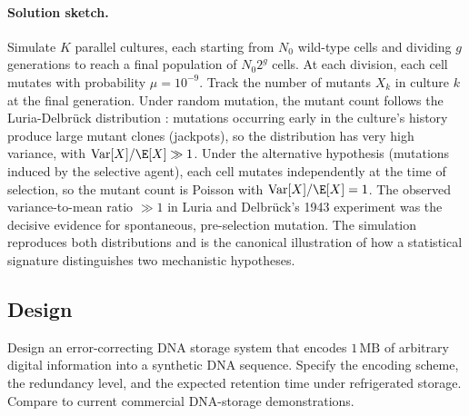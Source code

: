 \paragraph{Solution sketch.} Simulate $K$ parallel cultures, each
starting from $N_0$ wild-type cells and dividing $g$ generations to
reach a final population of $N_0 2^g$ cells. At each division, each
cell mutates with probability $\mu = 10^{-9}$. Track the number of
mutants $X_k$ in culture $k$ at the final generation. Under random
mutation, the mutant count follows the Luria-Delbr\"uck distribution
\cite{paper:v6c03-luria-delbruck-1943}: mutations occurring early in
the culture's history produce large mutant clones (jackpots), so
the distribution has very high variance, with $\text{Var}[X] /
\E[X] \gg 1$. Under the alternative hypothesis (mutations induced
by the selective agent), each cell mutates independently at the time
of selection, so the mutant count is Poisson with $\text{Var}[X] /
\E[X] = 1$. The observed variance-to-mean ratio
$\gg 1$ in Luria and Delbr\"uck's 1943 experiment was the decisive
evidence for spontaneous, pre-selection mutation. The simulation
reproduces both distributions and is the canonical illustration of
how a statistical signature distinguishes two mechanistic
hypotheses.

\subsection*{Design}

\begin{exercise}
Design an error-correcting DNA storage system that encodes
$1\,\text{MB}$ of arbitrary digital information into a synthetic DNA
sequence. Specify the encoding scheme, the redundancy level, and the
expected retention time under refrigerated storage. Compare to
current commercial DNA-storage demonstrations.
\end{exercise}

